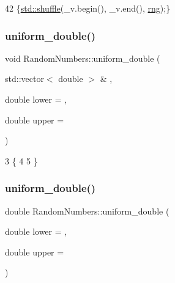 \begin{DoxyCode}
42 \{\hyperlink{random_8cpp_aa05dc7afcb8fa60859bfb09b0f312c73}{std::shuffle}(\_v.begin(), \_v.end(), \hyperlink{classRandomNumbers_a15ceee85d6d00de12ae76c90aaec2f14}{rng});\}
\end{DoxyCode}
\mbox{\label{classRandomNumbers_ae226c129494f9055ac37ed1af943d010}} 
\subsubsection{\texorpdfstring{uniform\+\_\+double()}{uniform\_double()}\hspace{0.1cm}{\footnotesize\ttfamily [1/2]}}
{\footnotesize\ttfamily void Random\+Numbers\+::uniform\+\_\+double (\begin{DoxyParamCaption}\item[{std\+::vector$<$ double $>$ \&}]{,  }\item[{double}]{lower = {},  }\item[{double}]{upper = {} }\end{DoxyParamCaption})}


\begin{DoxyCode}
3                                                                                      \{
4     
5 \}
\end{DoxyCode}
\mbox{\label{classRandomNumbers_a1e66bf9926ad3916f3804dd20ea393f1}} 
\subsubsection{\texorpdfstring{uniform\+\_\+double()}{uniform\_double()}\hspace{0.1cm}{\footnotesize\ttfamily [2/2]}}
{\footnotesize\ttfamily double Random\+Numbers\+::uniform\+\_\+double (\begin{DoxyParamCaption}\item[{double}]{lower = {},  }\item[{double}]{upper = {} }\end{DoxyParamCaption})}



